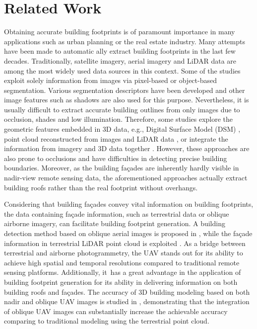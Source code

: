 \section{Related Work}\label{sec:related}
Obtaining accurate building footprints is of paramount importance in many applications such as urban planning or the real estate industry. Many attempts have been made to automatic ally extract building footprints in the last few decades. Traditionally, satellite imagery, aerial imagery and LiDAR data are among the most widely used data sources in this context. Some of the studies exploit solely information from images via pixel-based or object-based segmentation. Various segmentation descriptors \cite{DORNAIKA2016130} have been developed and other image features such as shadows \cite{ok2013exploiting} are also used for this purpose. Nevertheless, it is usually difficult to extract accurate building outlines from only images due to occlusion, shades and low illumination. Therefore, some studies explore the geometric features embedded in 3D data, e.g., Digital Surface Model (DSM) \cite{dini2013delineation}, point cloud reconstructed from images \cite{dai2017building} and LiDAR data \cite{awrangjeb2014automatic}, or integrate the information from imagery and 3D data together \cite{bittner2017building, li2013fusion}. However, these approaches are also prone to occlusions and have difficulties in detecting precise building boundaries. Moreover, as the building fa\c{c}ades are inherently hardly visible in nadir-view remote sensing data, the aforementioned approaches actually extract building roofs rather than the real footprint without overhangs.

Considering that building fa\c{c}ades convey vital information on building footprints, the data containing fa\c{c}ade information, such as terrestrial data or oblique airborne imagery, can facilitate building footprint generation. A building detection method based on oblique aerial images is proposed in \cite{nex2013building}, while the fa\c{c}ade information in terrestrial LiDAR point cloud is exploited \cite{Hammoudi2009ExtractingBF, yang2013semiautomated}. As a bridge between terrestrial and airborne photogrammetry, the UAV stands out for its ability to achieve high spatial and temporal resolutions compared to traditional remote sensing platforms. Additionally, it~has a great advantage in the application of building footprint generation for its ability in delivering information on both building roofs and fa\c{c}ades. The accuracy of 3D building modeling based on both nadir and oblique UAV images is studied in \cite{vacca2017the}, demonstrating that the integration of oblique UAV images can substantially increase the achievable accuracy comparing to traditional modeling using the terrestrial point cloud.




